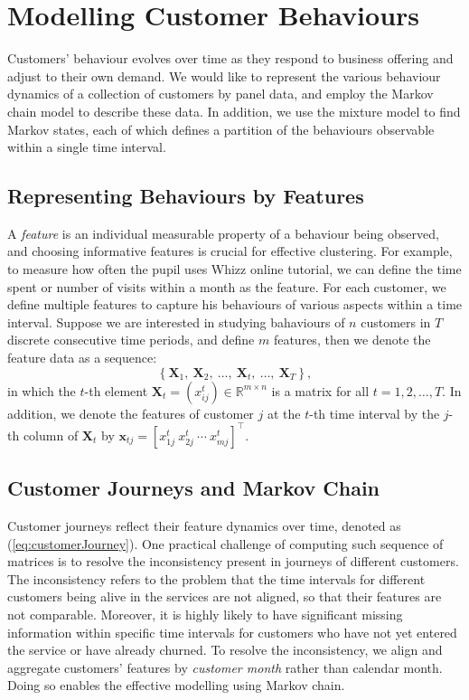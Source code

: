 \section{Modelling Customer Behaviours}
\label{sec:model}

Customers' behaviour evolves over time as they respond to business offering and adjust to their own demand. We would like to represent the various behaviour dynamics of a collection of customers by panel data, and employ the Markov chain model to describe these data. In addition, we use the mixture model to find Markov states, each of which defines a partition of the behaviours observable within a single time interval.

\subsection{Representing Behaviours by Features}

A \textit{feature} is an individual measurable property of a behaviour being observed, and choosing informative features is crucial for effective clustering. For example, to measure how often the pupil uses Whizz online tutorial, we can define the time spent or number of visits within a month as the feature. For each customer, we define multiple features to capture his behaviours of various aspects within a time interval. Suppose we are interested in studying bahaviours of $n$ customers in $T$ discrete consecutive time periods, and define $m$ features, then we denote the feature data as a sequence:
\begin{equation}
\label{eq:customerJourney}
\left\lbrace \mathbf{X}_1, ~\mathbf{X}_2, ~\dots, ~\mathbf{X}_t, ~\dots, ~\mathbf{X}_T \right\rbrace,
\end{equation}
in which the $t$-th element $\mathbf{X}_t = (x_{ij}^t) \in \mathbb{R}^{m \times n}$ is a matrix for all $t=1,2,\dots,T$. In addition, we denote the features of customer $j$ at the $t$-th time interval by the $j$-th column of $\mathbf{X}_t$ by $\mathbf{x}_{tj} = [x_{1j}^t ~x_{2j}^t ~\cdots ~x_{mj}^t]^\top$.

\subsection{Customer Journeys and Markov Chain}

Customer journeys reflect their feature dynamics over time, denoted as (\ref{eq:customerJourney}). One practical challenge of computing such sequence of matrices is to resolve the inconsistency present in journeys of different customers. The inconsistency refers to the problem that the time intervals for different customers being alive in the services are not aligned, so that their features are not comparable. Moreover, it is highly likely to have significant missing information within specific time intervals for customers who have not yet entered the service or have already churned. To resolve the inconsistency, we align and aggregate customers' features by \textit{customer month} rather than calendar month. Doing so enables the effective modelling using Markov chain.

